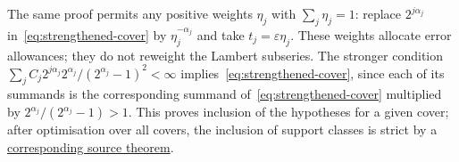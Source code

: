 \documentclass[11pt]{article}
\begin{document}
The same proof permits any positive weights $\eta_j$ with $\sum_j\eta_j=1$:
replace $2^{j\alpha_j}$ in~\eqref{eq:strengthened-cover} by
$\eta_j^{-\alpha_j}$ and take $t_j=\varepsilon\eta_j$.
These weights allocate error allowances; they do not reweight the
Lambert subseries.
The stronger condition
$\sum_jC_j2^{j\alpha_j}2^{\alpha_j}/(2^{\alpha_j}-1)^2<\infty$
implies~\eqref{eq:strengthened-cover}, since each of its summands is the
corresponding summand of~\eqref{eq:strengthened-cover} multiplied by
$2^{\alpha_j}/(2^{\alpha_j}-1)>1$.
This proves inclusion of the hypotheses for a given cover; after
optimisation over all covers, the inclusion of support classes is
strict by a \href{https://github.com/wcook04/plectis-erdos/blob/3973d3b10bce72017b8f60093f0d6c3f4f592d80/lean/ErdosProblems/Erdos257/PaperCompleteR8/AnalyticIncomparability.lean\#L41}{corresponding source theorem}.
\end{document}
